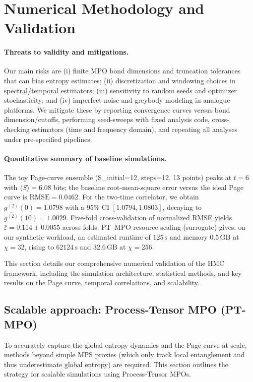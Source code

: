 \documentclass[a4paper,11pt]{article}
\newcommand{\HMC}{\textsc{HMC}\xspace}
\theoremstyle{plain}
\theoremstyle{definition}
\theoremstyle{remark}
\begin{document}
\section{Numerical Methodology and Validation}
\label{sec:numerical_validation}
\paragraph{Threats to validity and mitigations.}
Our main risks are (i) finite MPO bond dimensions and truncation tolerances that can bias entropy estimates; (ii) discretization and windowing choices in spectral/temporal estimators; (iii) sensitivity to random seeds and optimizer stochasticity; and (iv) imperfect noise and greybody modeling in analogue platforms. We mitigate these by reporting convergence curves versus bond dimension/cutoffs, performing seed-sweeps with fixed analysis code, cross-checking estimators (time and frequency domain), and repeating all analyses under pre-specified pipelines.

\paragraph{Quantitative summary of baseline simulations.}
The toy Page-curve ensemble (S\_initial=12, steps=12, 13 points) peaks at $t=6$ with $\langle S\rangle=6.08$ bits;
the baseline root-mean-square error versus the ideal Page curve is $\mathrm{RMSE}=0.0462$.
For the two-time correlator, we obtain $\overline{g^{(2)}}(0)=1.0798$ with a 95\% CI $[1.0794,1.0803]$, decaying to
$\overline{g^{(2)}}(10)=1.0029$. Five-fold cross-validation of normalized RMSE yields
$\bar{\varepsilon}=0.114\pm0.0055$ across folds.
PT--MPO resource scaling (surrogate) gives, on our synthetic workload, an estimated runtime of $125\,\mathrm{s}$ and
memory $0.5\,\mathrm{GB}$ at $\chi=32$, rising to $62124\,\mathrm{s}$ and $32.6\,\mathrm{GB}$ at $\chi=256$.

This section details our comprehensive numerical validation of the \HMC{} framework, including the simulation architecture, statistical methods, and key results on the Page curve, temporal correlations, and scalability.

\subsection{Scalable approach: Process-Tensor MPO (PT-MPO)}
\label{ssec:ptmpo}
To accurately capture the global entropy dynamics and the Page curve at scale, methods beyond simple MPS proxies (which only track local entanglement and thus underestimate global entropy) are required. This section outlines the strategy for scalable simulations using Process-Tensor MPOs.
\end{document}
